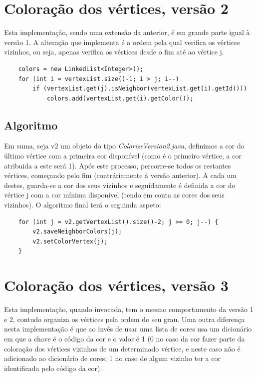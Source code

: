 \documentclass[a4paper,12pt]{report}
\begin{document}
\section{Coloração dos vértices, versão 2}

Esta implementação, sendo uma extensão da anterior, é em grande parte igual à versão 1. A alteração que implementa é a ordem pela qual verifica os vértices vizinhos, ou seja, apenas verifica os vértices desde o fim até ao vértice j.

\begin{lstlisting}
    colors = new LinkedList<Integer>();
    for (int i = vertexList.size()-1; i > j; i--)
        if (vertexList.get(j).isNeighbor(vertexList.get(i).getId()))
            colors.add(vertexList.get(i).getColor());
\end{lstlisting}

\subsection{Algoritmo}

Em suma, seja v2 um objeto do tipo \textit{ColorizeVersion2.java}, definimos a cor do último vértice com a primeira cor disponível (como é o primeiro vértice, a cor atribuida a este será 1).
Após este processo, percorre-se todos os restantes vértices, começando pelo fim (contráriamente à versão anterior). A cada um destes, guarda-se a cor dos seus vizinhos e seguidamente é definida a cor do vértice j com a cor mínima disponível (tendo em conta as cores dos seus vizinhos).
O algoritmo final terá o seguinda aspeto:

\begin{lstlisting}
    for (int j = v2.getVertexList().size()-2; j >= 0; j--) {
        v2.saveNeighborColors(j);
        v2.setColorVertex(j);
    }
\end{lstlisting}

\section{Coloração dos vértices, versão 3}

Esta implementação, quando invocada, tem o mesmo comportamento da versão 1 e 2, contudo organiza os vértices pela ordem do seu grau. Uma outra diferença nesta implementação é que ao invês de usar uma lista de cores usa um dicionário em que a chave é o código da cor e o valor é 1 (0 no caso da cor fazer parte da coloração dos vértices vizinhos de um determinado vértice, e neste caso não é adicionado ao dicionário de cores, 1 no caso de algum vizinho ter a cor identificada pelo código da cor).
\end{document}
